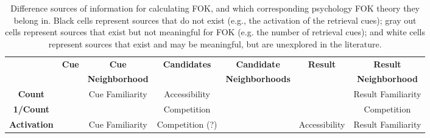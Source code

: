 \documentclass[10pt,letterpaper]{article}
\newcommand{\fixme}[2][]{#2}
\renewcommand{\fixme}[2][]{\textcolor{red}{#2}}
\newcommand{\tableheader}[1]{\multirow{2}{*}{\textbf{#1}}}
\newcommand{\whitecell}[0]{}
\newcommand{\graycell}[0]{\cellcolor{gray!70}}
\newcommand{\blackcell}[0]{\cellcolor{black}}
\begin{document}
\begin{table*}[ht]
\begin{tabular}{c|cccccc}
\whitecell           &  \tableheader{Cue}   &  \textbf{Cue}           &  \tableheader{Candidates}  &  \textbf{Candidate}      &  \tableheader{Result}  &  \textbf{Result}        \\  
\whitecell           &  \whitecell          &  \textbf{Neighborhood}  &  \whitecell                &  \textbf{Neighborhoods}  &  \whitecell            &  \textbf{Neighborhood}  \\  
\hline                                                                                                                                                                               
\textbf{Count}       &  \graycell           &  Cue Familiarity        &  Accessibility             &  \whitecell              &  \graycell             &  Result Familiarity     \\  
\textbf{1/Count}     &  \graycell           &  \whitecell             &  Competition               &  \whitecell              &  \graycell             &  Competition            \\  
\textbf{Activation}  &  \blackcell          &  Cue Familiarity        &  Competition (?)                &  \whitecell              &  Accessibility         &  Result Familiarity     \\  
\end{tabular}


\caption{
    Difference sources of information for calculating FOK, and which corresponding psychology FOK theory they belong in.
    Black cells represent sources that do not exist (e.g., the activation of the retrieval cues);
    gray out cells represent sources that exist but not meaningful for FOK (e.g. the number of retrieval cues);
    and white cells represent sources that exist and may be meaningful, but are unexplored in the literature.
    \fixme[Need to explain ``neighborhood'']{}
}
\label{sources}
\end{table*}
\end{document}
